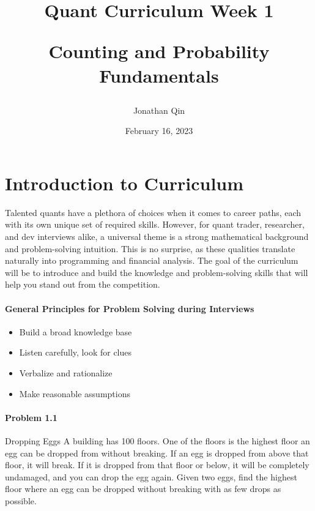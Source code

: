 \documentclass{article}
\title{

\begin{center} \textbf{Quant Curriculum Week 1}

Counting and Probability Fundamentals \end{center}
}
\author{Jonathan Qin}
\date{February 16, 2023}
\begin{document}
\maketitle

\section{Introduction to Curriculum}

\begin{Thinking and Problem Solving}

Talented quants have a plethora of choices when it comes to career paths, each with its own unique set of required skills. However, for quant trader, researcher, and dev interviews alike, a universal theme is a strong mathematical background and problem-solving intuition. This is no surprise, as these qualities translate naturally into programming and financial analysis. The goal of the curriculum will be to introduce and build the knowledge and problem-solving skills that will help you stand out from the competition. 

\end{Thinking and Problem Solving}

\paragraph{General Principles for Problem Solving during Interviews}
\begin{itemize}
    \item Build a broad knowledge base
    \item Listen carefully, look for clues 
    \item Verbalize and rationalize 
    \item Make reasonable assumptions
\end{itemize}

\paragraph{Problem 1.1} Dropping Eggs
\newline
\newline
A building has 100 floors. One of the floors is the highest floor an egg can be dropped from without breaking.
If an egg is dropped from above that floor, it will break. If it is dropped from that floor or below, it will be completely undamaged, and you can drop the egg again. Given two eggs, find the highest floor where an egg can be dropped without breaking with as few drops as possible. 
\newline
\newline
\end{document}
